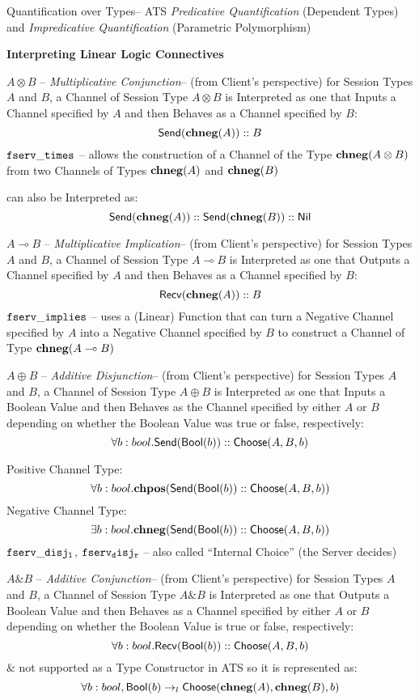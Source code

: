 Quantification over Types-- ATS \emph{Predicative Quantification}
(Dependent Types) and \emph{Impredicative Quantification} (Parametric
Polymorphism)


\textbf{Interpreting Linear Logic Connectives}

$A \otimes B$ -- \emph{Multiplicative Conjunction}-- (from Client's
perspective) for Session Types $A$ and $B$, a Channel of Session Type
$A \otimes B$ is Interpreted as one that Inputs a Channel specified by
$A$ and then Behaves as a Channel specified by $B$:
\[
  \mathsf{Send}(\mathbf{chneg}(A)) :: B
\]
$\mathtt{fserv\_times}$ -- allows the construction of a Channel of the
Type $\mathbf{chneg}(A \otimes B)$ from two Channels of Types $\mathbf{chneg}(A)$ and
$\mathbf{chneg}(B)$

can also be Interpreted as:
\[
  \mathsf{Send}(\mathbf{chneg}(A)) :: \mathsf{Send}(\mathbf{chneg}(B)) :: \mathsf{Nil}
\]

$A \multimap B$ -- \emph{Multiplicative Implication}-- (from Client's
perspective) for Session Types $A$ and $B$, a Channel of Session Type
$A \multimap B$ is Interpreted as one that Outputs a Channel specified
by $A$ and then Behaves as a Channel specified by $B$:
\[
  \mathsf{Recv}(\mathbf{chneg}(A)) :: B
\]
$\mathtt{fserv\_implies}$ -- uses a (Linear) Function that can turn a
Negative Channel specified by $A$ into a Negative Channel specified by
$B$ to construct a Channel of Type $\mathbf{chneg}(A \multimap B)$

$A \oplus B$ -- \emph{Additive Disjunction}-- (from Client's
perspective) for Session Types $A$ and $B$, a Channel of Session Type
$A \oplus B$ is Interpreted as one that Inputs a Boolean Value and
then Behaves as the Channel specified by either $A$ or $B$ depending
on whether the Boolean Value was true or false, respectively:
\[
  \forall b : bool. \mathsf{Send}(\mathsf{Bool}(b)) :: \mathsf{Choose}(A,B,b)
\]

Positive Channel Type:
\[
  \forall b : bool. \mathbf{chpos}(\mathsf{Send}(\mathsf{Bool}(b)) :: \mathsf{Choose}(A,B,b))
\]
Negative Channel Type:
\[
  \exists b : bool. \mathbf{chneg}(\mathsf{Send}(\mathsf{Bool}(b)) :: \mathsf{Choose}(A,B,b))
\]
$\mathtt{fserv\_disj_l}$, $\mathtt{fserv_disj_r}$ -- also called ``Internal
Choice'' (the Server decides)

$A \& B$ -- \emph{Additive Conjunction}-- (from Client's perspective)
for Session Types $A$ and $B$, a Channel of Session Type $A \& B$ is
Interpreted as one that Outputs a Boolean Value and then Behaves as a
Channel specified by either $A$ or $B$ depending on whether the
Boolean Value is true or false, respectively:
\[
  \forall b : bool. \mathsf{Recv}(\mathsf{Bool}(b)) :: \mathsf{Choose}(A,B,b)
\]
$\&$ not supported as a Type Constructor in ATS so it is represented
as:
\[
  \forall b:bool,
    \mathsf{Bool}(b) \rightarrow_l \mathsf{Choose}(\mathbf{chneg}(A), \mathbf{chneg}(B), b)
\]

